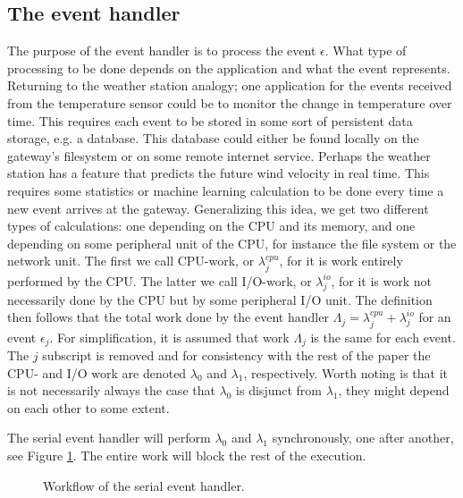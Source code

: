 \subsection{The event handler}
\label{sec:the_event_handler}

The purpose of the event handler is to process the event $\epsilon$. What type
of processing to be done depends on the application and what the event
represents. Returning to the weather station analogy; one application for the
events received from the temperature sensor could be to monitor the change in
temperature over time. This requires each event to be stored in some sort of
persistent data storage, e.g. a database. This database could either be found
locally on the gateway's filesystem or on some remote internet service. Perhaps
the weather station has a feature that predicts the future wind velocity in
real time. This requires some statistics or machine learning calculation to be
done every time a new event arrives at the gateway. Generalizing this idea, we
get two different types of calculations: one depending on the CPU and its
memory, and one depending on some peripheral unit of the CPU, for instance the
file system or the network unit. The first we call CPU-work, or
$\lambda^{cpu}_j$, for it is work entirely performed by the CPU. The latter we
call I/O-work, or $\lambda^{io}_j$, for it is work not necessarily done by the
CPU but by some peripheral I/O unit. The definition then follows that the total
work done by the event handler $\Lambda_j = \lambda^{cpu}_j + \lambda^{io}_j$
for an event $\epsilon_j$. For simplification, it is assumed that work
$\Lambda_j$ is the same for each event. The $j$ subscript is removed and for
consistency with the rest of the paper the CPU- and I/O work are denoted
$\lambda_0$ and $\lambda_1$, respectively. Worth noting is that it is not
necessarily always the case that $\lambda_0$ is disjunct from $\lambda_1$, they
might depend on each other to some extent.

The serial event handler will perform $\lambda_0$ and $\lambda_1$
synchronously, one after another, see Figure \ref{fig:event_handler_serial}.
The entire work will block the rest of the execution.

\begin{figure}[h!]
    \centering

    \caption{Workflow of the serial event handler.}
    \label{fig:event_handler_serial}
\end{figure}

